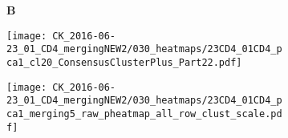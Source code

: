 \documentclass[a4paper, 12pt]{article}
\begin{document}
\clearpage

\begin{figure}[!thb]
\centering

    \caption{Data 23\_01 CD4, merging5 - 5 clusters}
    \begin{subfigure}[t]{0.02\textwidth}
    \vskip 0pt
        \textbf{\textsf{\normalsize B}}
    \end{subfigure}
    \begin{subfigure}[t]{0.45\textwidth}
    \vskip 0pt
    \caption{}
        \texttt{[image: CK\_2016-06-23\_01\_CD4\_mergingNEW2/030\_heatmaps/23CD4\_01CD4\_pca1\_cl20\_ConsensusClusterPlus\_Part22.pdf]}
    \end{subfigure}

\end{figure}



\begin{figure}[!thb]
\centering

    \caption{}
    \begin{subfigure}[t]{0.02\textwidth}
    \vskip 0pt
        \textbf{\textsf{\normalsize }}
    \end{subfigure}
    \begin{subfigure}[t]{0.9\textwidth}
    \vskip 0pt
    \caption{}
        \texttt{[image: CK\_2016-06-23\_01\_CD4\_mergingNEW2/030\_heatmaps/23CD4\_01CD4\_pca1\_merging5\_raw\_pheatmap\_all\_row\_clust\_scale.pdf]}
    \end{subfigure}
    

\end{figure}
\end{document}
